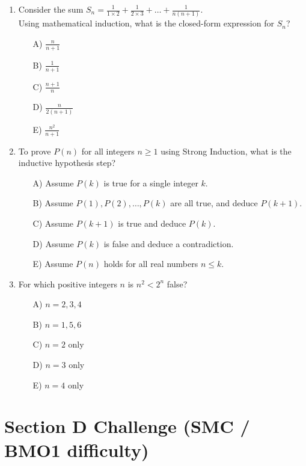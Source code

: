 \documentclass[11pt,a4paper]{article}
\begin{document}
\begin{enumerate}
\item Consider the sum $S_n = \frac{1}{1 \times 2} + \frac{1}{2 \times 3} + \dots + \frac{1}{n(n+1)}$.\\
Using mathematical induction, what is the closed-form expression for $S_n$?
\begin{itemize}
\item[A)] $\frac{n}{n+1}$
\item[B)] $\frac{1}{n+1}$
\item[C)] $\frac{n+1}{n}$
\item[D)] $\frac{n}{2(n+1)}$
\item[E)] $\frac{n^2}{n+1}$
\end{itemize}

\item To prove $P(n)$ for all integers $n \ge 1$ using Strong Induction, what is the inductive hypothesis step?
\begin{itemize}
\item[A)] Assume $P(k)$ is true for a single integer $k$.
\item[B)] Assume $P(1), P(2), \dots, P(k)$ are all true, and deduce $P(k+1)$.
\item[C)] Assume $P(k+1)$ is true and deduce $P(k)$.
\item[D)] Assume $P(k)$ is false and deduce a contradiction.
\item[E)] Assume $P(n)$ holds for all real numbers $n \le k$.
\end{itemize}

\item For which positive integers $n$ is $n^2 < 2^n$ false?
\begin{itemize}
\item[A)] $n = 2, 3, 4$
\item[B)] $n = 1, 5, 6$
\item[C)] $n = 2$ only
\item[D)] $n = 3$ only
\item[E)] $n = 4$ only
\end{itemize}

\end{enumerate}

\section*{Section D \quad Challenge \hfill{\normalfont\small(SMC / BMO1 difficulty)}}
\end{document}
